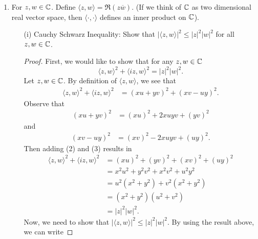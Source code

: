 \documentclass[a4paper]{article}
\begin{document}
\begin{enumerate}
\begin{proof}
\begin{align*}
        \end{align*}
        which completes our induction argument. 
        \end{proof}
    \item  For \( z,w \in \mathbb{C}  \). Define \( \langle z , w \rangle = \Re(z \overline{w}) \). (If we think of \(  \mathbb{C}  \) as two dimensional real vector space, then \( \langle \cdot  ,  \cdot  \rangle  \) defines an inner product on \( \mathbb{C}  \)). 
        \begin{enumerate}
            \item[(i)] Cauchy Schwarz Inequality: 
                Show that \( | \langle z , w \rangle |^{2} \leq | z |^{2} | w |^{2} \) for all \( z,w \in \mathbb{C}  \).
                \begin{proof}
                First, we would like to show that for any \( z,w \in \mathbb{C}  \)
                \[ \langle z , w \rangle^{2} + \langle iz , w \rangle^{2} = | z |^{2} | w |^{2}.    \]
                Let \( z,w \in \mathbb{C}  \). By definition of \( \langle z , w \rangle \), we see that 
                \begin{align*}
                    \langle z , w \rangle^{2} + \langle iz  , w  \rangle^{2} &= (xu + yv)^{2} + (xv - uy)^{2}. \tag{1}
    \end{align*}
    Observe that 
    \begin{align*}
        (xu + yv)^{2} &= (xu)^{2} + 2xuyv + (yv)^{2} \tag{2}
    \end{align*}
    and
    \begin{align*}
        (xv - uy)^{2} &= (xv)^{2} - 2xuyv + (uy)^{2}. \tag{3}
    \end{align*}
    Then adding (2) and (3) results in 
    \begin{align*}
        \langle z , w \rangle^{2} + \langle iz , w \rangle^{2} &= (xu)^{2} + (yv)^{2} + (xv)^{2} + (uy)^{2} \\
                                                               &= x^{2} u^{2} + y^{2} v^{2} + x^{2} v^{2} + u^{2} y^{2} \\
                                                               &= u^{2} (x^{2} + y^{2}) + v^{2} (x^{2} + y^{2}) \\
                                                               &= (x^{2} + y^{2}) (u^{2} + v^{2}) \\
                                                               &= | z  |^{2} | w |^{2}.
    \end{align*}
    Now, we need to show that \( | \langle z , w \rangle |^{2} \leq | z |^{2} | w |^{2}  \). By using the result above, we can write      

\end{proof}
\end{enumerate}
\end{enumerate}
\end{document}
